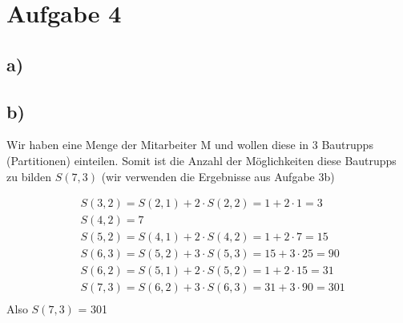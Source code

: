 \section*{Aufgabe 4}
\subsection*{a)}
\subsection*{b)}
Wir haben eine Menge der Mitarbeiter M und wollen diese in 3 Bautrupps (Partitionen) einteilen. Somit ist die Anzahl der Möglichkeiten diese Bautrupps zu bilden $ S(7,3) $ (wir verwenden die Ergebnisse aus Aufgabe 3b)

\begin{align*}
  &S(3,2) = S(2,1) + 2\cdot S(2,2) = 1 + 2\cdot1 = 3 \\
  &S(4,2) = 7 \\
  &S(5,2) = S(4,1) + 2\cdot S(4,2) = 1 + 2\cdot7 = 15 \\
  &S(6,3) = S(5,2) + 3\cdot S(5,3) = 15 + 3\cdot25 = 90 \\
  &S(6,2) = S(5,1) + 2\cdot S(5,2) = 1 + 2\cdot15 = 31 \\
  &S(7,3) = S(6,2) + 3\cdot S(6,3) = 31 + 3\cdot90 = 301 \\
\end{align*}
Also $ S(7,3) $ = 301